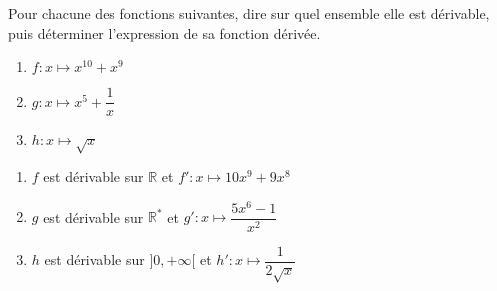 \documentclass[a4paper,11pt,exos]{nsi} %
\begin{document}

\maketitle

\begin{exercice}
    Pour chacune des fonctions suivantes, dire sur quel ensemble elle est dérivable, puis déterminer l'expression de sa fonction dérivée.
    \begin{multicols}{3}
        \begin{enumerate}
            \item $f:x\longmapsto { x}^{10}+{ x}^{9}$
        
            \item $g:x\longmapsto { x}^{5}+\dfrac{1}{ x}$
            \item $h:x\longmapsto \sqrt{ x}$
        \end{enumerate}
    \end{multicols}
    
\end{exercice}

\begin{enumerate}[itemsep=1em]
    \item $f$ est dérivable sur $\mathbb{R}$ et $ f':x\longmapsto 10{ x}^{9}+9{ x}^{8}$
    \item $g$ est dérivable sur $\mathbb{R}^{\text{*}}$ et $ g':x\longmapsto \dfrac{5{ x}^{6}-1}{{ x}^{2}}$
    
    \item $h$ est dérivable sur $]0,+\infty[$ et $ h':x\longmapsto \dfrac{1}{2\sqrt{ x}}$
    \end{enumerate}
\end{document}
